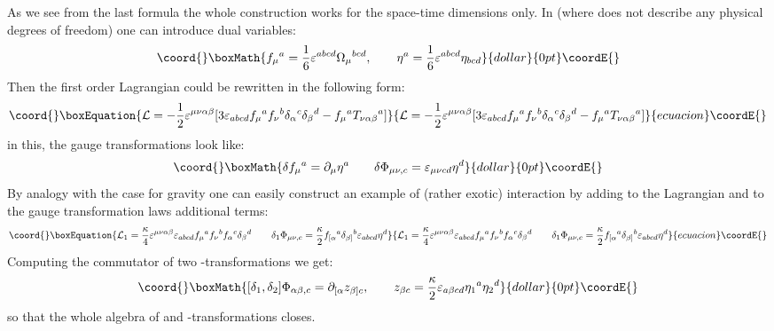 \documentclass[a4paper,12pt]{article}
\begin{document}
As we see from the last formula the whole construction works for the
space-time dimensions \coordHE{} only. In \coordHE{} (where
\myHighlight{$\Phi_{\mu\nu,\alpha}$}\coordHE{} does not describe any physical degrees of
freedom) one can introduce dual variables:
$$\coord{}\boxMath{
f_\mu{}^a = \frac{1}{6} \varepsilon^{abcd} \Omega_\mu{}^{bcd}, \qquad
\eta^a = \frac{1}{6} \varepsilon^{abcd} \eta_{bcd}
}{dollar}{0pt}\coordE{}$$
Then the first order Lagrangian could be rewritten in the following
form:
\begin{equation}\coord{}\boxEquation{
{\cal L} = - \frac{1}{2} \varepsilon^{\mu\nu\alpha\beta} [ 3
\varepsilon_{abcd} f_\mu{}^a f_\nu{}^b \delta_\alpha{}^c
\delta_\beta{}^d - f_\mu{}^a T_{\nu\alpha\beta}{}^a ]
}{
{\cal L} = - \frac{1}{2} \varepsilon^{\mu\nu\alpha\beta} [ 3
\varepsilon_{abcd} f_\mu{}^a f_\nu{}^b \delta_\alpha{}^c
\delta_\beta{}^d - f_\mu{}^a T_{\nu\alpha\beta}{}^a ]
}{ecuacion}\coordE{}\end{equation}
in this, the gauge transformations look like:
$$\coord{}\boxMath{
\delta f_\mu{}^a = \partial_\mu \eta^a \qquad \delta \Phi_{\mu\nu,c} =
\varepsilon_{\mu\nu cd} \eta^d
}{dollar}{0pt}\coordE{}$$
By analogy with the \coordHE{} case for gravity one can easily construct
an example of (rather exotic) interaction by adding to the Lagrangian
and to the gauge transformation laws additional terms:
\begin{equation}\coord{}\boxEquation{
{\cal L}_1 = \frac{\kappa}{4} \varepsilon^{\mu\nu\alpha\beta}
\varepsilon_{abcd} f_\mu{}^a f_\nu{}^b f_\alpha{}^c \delta_\beta{}^d
\qquad \delta_1 \Phi_{\mu\nu,c} = \frac{\kappa}{2} f_{[\alpha}{}^a
\delta_{\beta]}{}^b \varepsilon_{abcd} \eta^d
}{
{\cal L}_1 = \frac{\kappa}{4} \varepsilon^{\mu\nu\alpha\beta}
\varepsilon_{abcd} f_\mu{}^a f_\nu{}^b f_\alpha{}^c \delta_\beta{}^d
\qquad \delta_1 \Phi_{\mu\nu,c} = \frac{\kappa}{2} f_{[\alpha}{}^a
\delta_{\beta]}{}^b \varepsilon_{abcd} \eta^d
}{ecuacion}\coordE{}\end{equation}
Computing the commutator of two \myHighlight{$\eta$}\coordHE{}-transformations we get:
$$\coord{}\boxMath{
[\delta_1, \delta_2] \Phi_{\alpha\beta,c} = \partial_{[\alpha}
z_{\beta]c}, \qquad z_{\beta c} = \frac{\kappa}{2}
\varepsilon_{a\beta cd} \eta_1{}^a \eta_2{}^d
}{dollar}{0pt}\coordE{}$$
so that the whole algebra of \coordHE{} and \myHighlight{$\eta$}\coordHE{}-transformations
closes.
\end{document}
